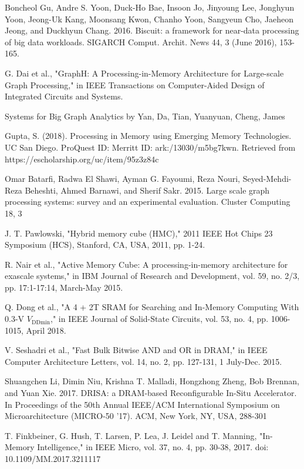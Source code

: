 \documentclass[conference,compsoc]{IEEEtran}
\begin{document}
\begin{thebibliography}{10}
 Boncheol Gu, Andre S. Yoon, Duck-Ho Bae, Insoon Jo, Jinyoung Lee, Jonghyun Yoon, Jeong-Uk Kang, Moonsang Kwon, Chanho Yoon, Sangyeun Cho, Jaeheon Jeong, and Duckhyun Chang. 2016. Biscuit: a framework for near-data processing of big data workloads. SIGARCH Comput. Archit. News 44, 3 (June 2016), 153-165.

 G. Dai et al., "GraphH: A Processing-in-Memory Architecture for Large-scale Graph Processing," in IEEE Transactions on Computer-Aided Design of Integrated Circuits and Systems.

 Systems for Big Graph Analytics by Yan, Da, Tian, Yuanyuan, Cheng, James

 Gupta, S. (2018). Processing in Memory using Emerging Memory Technologies. UC San Diego. ProQuest ID: 
Merritt ID: ark:/13030/m5bg7kwn. Retrieved from https://escholarship.org/uc/item/95z3z84c

 Omar Batarfi, Radwa El Shawi, Ayman G. Fayoumi, Reza Nouri, Seyed-Mehdi-Reza Beheshti, Ahmed Barnawi, and Sherif Sakr. 2015. Large scale graph processing systems: survey and an experimental evaluation. Cluster Computing 18, 3

 J. T. Pawlowski, "Hybrid memory cube (HMC)," 2011 IEEE Hot Chips 23 Symposium (HCS), Stanford, CA, USA, 2011, pp. 1-24. 

 R. Nair et al., "Active Memory Cube: A processing-in-memory architecture for exascale systems," in IBM Journal of Research and Development, vol. 59, no. 2/3, pp. 17:1-17:14, March-May 2015.

 Q. Dong et al., "A 4 + 2T SRAM for Searching and In-Memory Computing With 0.3-V $V_{\mathrm {DDmin}}$," in IEEE Journal of Solid-State Circuits, vol. 53, no. 4, pp. 1006-1015, April 2018.

 V. Seshadri et al., "Fast Bulk Bitwise AND and OR in DRAM," in IEEE Computer Architecture Letters, vol. 14, no. 2, pp. 127-131, 1 July-Dec. 2015.

 Shuangchen Li, Dimin Niu, Krishna T. Malladi, Hongzhong Zheng, Bob Brennan, and Yuan Xie. 2017. DRISA: a DRAM-based Reconfigurable In-Situ Accelerator. In Proceedings of the 50th Annual IEEE/ACM International Symposium on Microarchitecture (MICRO-50 '17). ACM, New York, NY, USA, 288-301

 T. Finkbeiner, G. Hush, T. Larsen, P. Lea, J. Leidel and T. Manning, "In-Memory Intelligence," in IEEE Micro, vol. 37, no. 4, pp. 30-38, 2017. doi: 10.1109/MM.2017.3211117


\end{thebibliography}
\end{document}
